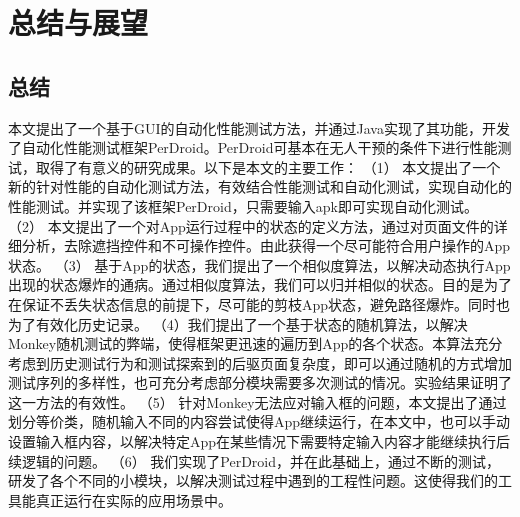 \chapter{总结与展望}
\label{chp:future}
\section{总结}



本文提出了一个基于GUI的自动化性能测试方法，并通过Java实现了其功能，开发了自动化性能测试框架PerDroid。PerDroid可基本在无人干预的条件下进行性能测试，取得了有意义的研究成果。以下是本文的主要工作：
（1） 本文提出了一个新的针对性能的自动化测试方法，有效结合性能测试和自动化测试，实现自动化的性能测试。并实现了该框架PerDroid，只需要输入apk即可实现自动化测试。
（2） 本文提出了一个对App运行过程中的状态的定义方法，通过对页面文件的详细分析，去除遮挡控件和不可操作控件。由此获得一个尽可能符合用户操作的App状态。
（3） 基于App的状态，我们提出了一个相似度算法，以解决动态执行App出现的状态爆炸的通病。通过相似度算法，我们可以归并相似的状态。目的是为了在保证不丢失状态信息的前提下，尽可能的剪枝App状态，避免路径爆炸。同时也为了有效化历史记录。
（4）我们提出了一个基于状态的随机算法，以解决Monkey随机测试的弊端，使得框架更迅速的遍历到App的各个状态。本算法充分考虑到历史测试行为和测试探索到的后驱页面复杂度，即可以通过随机的方式增加测试序列的多样性，也可充分考虑部分模块需要多次测试的情况。实验结果证明了这一方法的有效性。
（5） 针对Monkey无法应对输入框的问题，本文提出了通过划分等价类，随机输入不同的内容尝试使得App继续运行，在本文中，也可以手动设置输入框内容，以解决特定App在某些情况下需要特定输入内容才能继续执行后续逻辑的问题。
（6） 我们实现了PerDroid，并在此基础上，通过不断的测试，研发了各个不同的小模块，以解决测试过程中遇到的工程性问题。这使得我们的工具能真正运行在实际的应用场景中。





